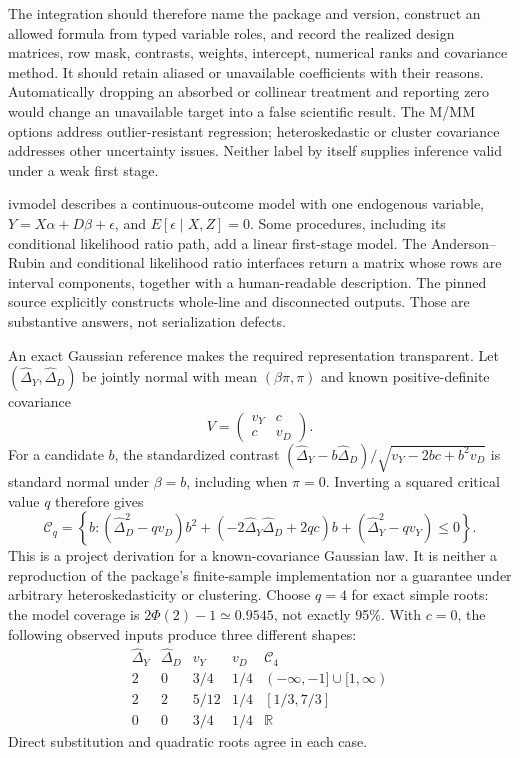The integration should therefore name the package and version, construct an
allowed formula from typed variable roles, and record the realized design
matrices, row mask, contrasts, weights, intercept, numerical ranks and covariance
method. It should retain aliased or unavailable coefficients with their reasons.
Automatically dropping an absorbed or collinear treatment and reporting zero
would change an unavailable target into a false scientific result. The M/MM
options address outlier-resistant regression; heteroskedastic or cluster covariance
addresses other uncertainty issues. Neither label by itself supplies inference
valid under a weak first stage.

ivmodel describes a continuous-outcome model with one endogenous variable,
$Y=X\alpha+D\beta+\epsilon$, and $E[\epsilon\mid X,Z]=0$. Some procedures,
including its conditional likelihood ratio path, add a linear first-stage model.
The Anderson--Rubin and conditional likelihood ratio interfaces return a matrix
whose rows are interval components, together with a human-readable description.
The pinned source explicitly constructs whole-line and disconnected outputs.
Those are substantive answers, not serialization defects.
\citep{exec22_riv_ivmodel}

An exact Gaussian reference makes the required representation transparent. Let
$(\widehat\Delta_Y,\widehat\Delta_D)$ be jointly normal with mean
$(\beta\pi,\pi)$ and known positive-definite covariance
\begin{equation}
 V=\begin{pmatrix}v_Y&c\\c&v_D\end{pmatrix}.
 \label{exec22:riv-gaussian}
\end{equation}
For a candidate $b$, the standardized contrast
$(\widehat\Delta_Y-b\widehat\Delta_D)/\sqrt{v_Y-2bc+b^2v_D}$ is standard
normal under $\beta=b$, including when $\pi=0$. Inverting a squared critical
value $q$ therefore gives
\begin{equation}
 \mathcal C_q=\left\{b:
 (\widehat\Delta_D^2-qv_D)b^2+
 (-2\widehat\Delta_Y\widehat\Delta_D+2qc)b+
 (\widehat\Delta_Y^2-qv_Y)\leq0\right\}.
 \label{exec22:riv-set}
\end{equation}
This is a project derivation for a known-covariance Gaussian law. It is neither
a reproduction of the package's finite-sample implementation nor a guarantee
under arbitrary heteroskedasticity or clustering. Choose $q=4$ for exact simple
roots: the model coverage is $2\Phi(2)-1\simeq0.9545$, not exactly 95\%.
With $c=0$, the following observed inputs produce three different shapes:
\begin{equation}
\begin{array}{cc|cc|l}
 \widehat\Delta_Y&\widehat\Delta_D&v_Y&v_D&\mathcal C_4\\\hline
 2&0&3/4&1/4&(-\infty,-1]\cup[1,\infty)\\
 2&2&5/12&1/4&[1/3,7/3]\\
 0&0&3/4&1/4&\mathbb R
\end{array}
\label{exec22:riv-topology}
\end{equation}
Direct substitution and quadratic roots agree in each case.
\citep{exec22_riv_reference}

